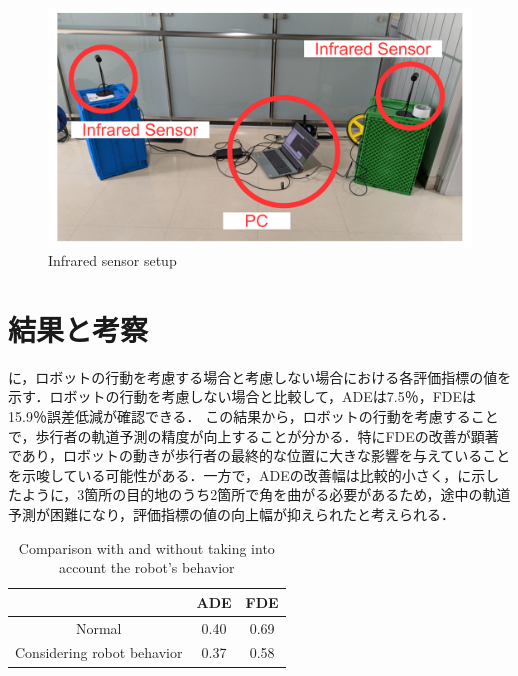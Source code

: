 \vspace{-20pt}

\begin{figure}[H]
  \centering
 \includegraphics[keepaspectratio, scale=0.32]
      {images/tracking-sensor.pdf}
\caption{Infrared sensor setup}
 \label{Fig:oculus-sensor}
\end{figure}

\vspace{-20pt}

\section{結果と考察}\label{sec:oculus-exp-result}
に，ロボットの行動を考慮する場合と考慮しない場合における各評価指標の値を示す．ロボットの行動を考慮しない場合と比較して，ADEは7.5％，FDEは15.9％誤差低減が確認できる．
この結果から，ロボットの行動を考慮することで，歩行者の軌道予測の精度が向上することが分かる．特にFDEの改善が顕著であり，ロボットの動きが歩行者の最終的な位置に大きな影響を与えていることを示唆している可能性がある．一方で，ADEの改善幅は比較的小さく，に示したように，3箇所の目的地のうち2箇所で角を曲がる必要があるため，途中の軌道予測が困難になり，評価指標の値の向上幅が抑えられたと考えられる．

\begin{table}[H]
  \begin{center}
  \caption{Comparison with and without taking into account the robot's behavior}
  \label{tab:robot-behavior}
  \begin{tabular}{c||c|c}
   & ADE & FDE \\ 
  \hline \hline
  Normal      & 0.40       & 0.69                      \\
  \hline
  Considering robot behavior    & 0.37       & 0.58                      \\
  \hline
  \end{tabular}
  \end{center}
\end{table}

